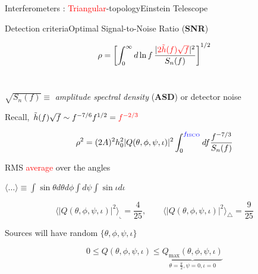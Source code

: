\documentclass[xcolor=dvipsnames,handout,t]{beamer}
\newcommand{\red}[1]{\textcolor{red}{#1}}
\newcommand{\bl}[1]{\textcolor{blue}{#1}}
\newcommand{\f}{\frac}
\begin{document}
\begin{frame}{Interferometers : \red{Triangular}-topology}{Einstein Telescope}
{
  }

   
\end{frame}


\begin{frame}{Detection criteria}{Optimal Signal-to-Noise Ratio ({\bf SNR})}
  \vspace{-5mm}
  \begin{footnotesize} 
  \[
  \rho=\left[ \int_0^\infty d\ln f\, \f{|\red{2\tilde{h}(f)\sqrt{f}}|^2}{S_n(f)}\right]^{1/2} 
  \]
  \\
  \end{footnotesize}
  $\sqrt{S_n(f)}\equiv$ {\it amplitude spectral density} ({\bf ASD}) or  detector noise
  \\
  {
    \vspace{3mm}
    Recall, $\tilde{h}(f) \sqrt{f} \sim f^{-7/6} f^{1/2} = \red{f^{-2/3}}$
    \begin{footnotesize} 
    \[
    \rho^2 =  (2A)^2 h_0^2 |Q(\theta,\phi,\psi,\iota)|^2 \int_0^{\bl{f_\text{ISCO}}} df \f{f^{-7/3}}{S_n(f)} 
    \]
    \end{footnotesize}
  }
  RMS \red{average} over the angles 
  \begin{small}
  $ \langle \ldots \rangle \equiv \int \sin\theta d\theta d\phi \int d\psi \int\sin\iota d\iota $
  \end{small}
  \begin{footnotesize} 
  \[
  \langle |Q(\theta,\phi,\psi,\iota)|^2 \rangle_\llcorner = \f{4}{25}, \qquad \langle |Q(\theta,\phi,\psi,\iota)|^2 \rangle_\triangle = \f{9}{25}
  \]
  \end{footnotesize}
  Sources will have random $\{\theta,\phi,\psi,\iota\}$ \\
  \begin{footnotesize} 
  \[
  0 \le Q(\theta,\phi,\psi,\iota) \le \underbrace{Q_\text{max}(\theta,\phi,\psi,\iota)}_{\theta=\tfrac{\pi}{2},\psi=0,\iota=0}
  \]
  \end{footnotesize}
\end{frame}
\end{document}
